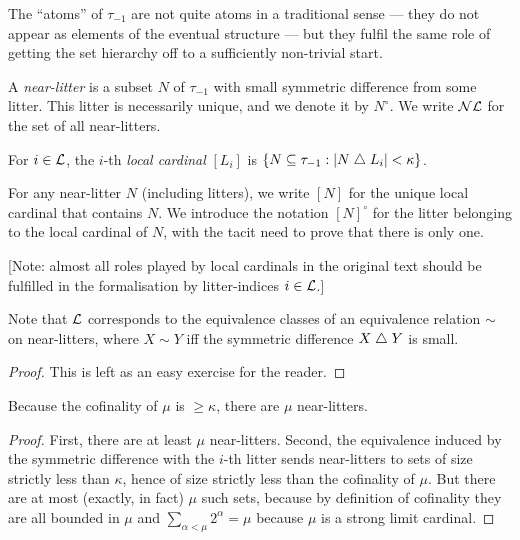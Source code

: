 The “atoms” of $\tau_{-1}$ are not quite atoms in a traditional sense — they do not appear as elements of the eventual structure — but they fulfil the same role of getting the set hierarchy off to a sufficiently non-trivial start.

\begin{definition}
\label {def:near-litter}
\leanok
{}
A \emph{near-litter} is a subset $N$ of $\tau_{-1}$ with small symmetric difference from some litter. This litter is necessarily unique, and we denote it by $N^\circ$.  We write $\mathcal{NL}$ for the set of all near-litters.
\end{definition}

\begin{definition}
\label {def:local-cardinal}
\leanok
For $i \in \mathcal{L}$, the $i$-th {\em local cardinal} $[L_i]$ is $\{N \subseteq \tau_{-1}:|N \mathrel{\triangle} L_i|<\kappa\}$.

For any near-litter $N$ (including litters), we write $[N]$ for the unique local cardinal that contains $N$. We introduce the notation $[N]^\circ$ for the litter belonging to the local cardinal of $N$, with the tacit need to prove that there is only one.

[Note: almost all roles played by local cardinals in the original text should be fulfilled in the formalisation by litter-indices $i \in \mathcal{L}$.]
\end{definition}

\begin{lemma}
\label {lem:small-diff-equiv}
\leanok
{}
Note that $\mathcal{L}$ corresponds to the equivalence classes of an equivalence relation $\sim$ on near-litters, where $X \sim Y$ iff the symmetric difference $X \mathrel{\triangle} Y$ is small.
\end{lemma}

\begin{proof}
\leanok
This is left as an easy exercise for the reader.
\end{proof}

\begin{lemma}
\label {lem:count-near-litters}
\leanok
{}
Because the cofinality of $\mu$ is $\geq \kappa$, there are $\mu$ near-litters.
\end{lemma}

\begin{proof}
\leanok
First, there are at least $\mu$ near-litters. Second, the equivalence induced by the symmetric difference with the $i$-th litter sends near-litters to sets of size strictly less than $\kappa$, hence of size strictly less than the cofinality of $\mu$. But there are at most (exactly, in fact) $\mu$ such sets, because by definition of cofinality they are all bounded in $\mu$ and $\sum_{\alpha < \mu} 2 ^ \alpha = \mu $ because $\mu$ is a strong limit cardinal.
\end{proof}

